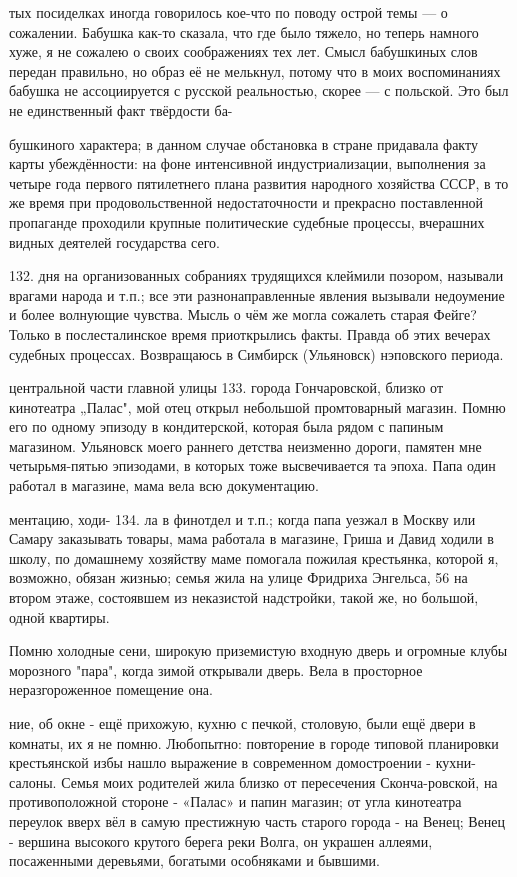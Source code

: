 тых посиделках иногда говорилось кое-что по поводу острой темы — о сожалении. Бабушка как-то сказала, что где было тяжело, но теперь намного хуже, я не сожалею о своих соображениях тех лет. Смысл бабушкиных слов передан правильно, но образ её не мелькнул, потому что в моих воспоминаниях бабушка не ассоциируется с русской реальностью, скорее — с польской. Это был не единственный факт твёрдости ба-

бушкиного характера; в данном случае обстановка в стране придавала факту карты убеждённости: на фоне интенсивной индустриализации, выполнения за четыре года первого пятилетнего плана развития народного хозяйства СССР, в то же время при продовольственной недостаточности и прекрасно поставленной пропаганде проходили крупные политические судебные процессы, вчерашних видных деятелей государства сего.

132. дня на организованных собраниях трудящихся клеймили позором, называли врагами народа и т.п.; все эти разнонаправленные явления вызывали недоумение и более волнующие чувства. Мысль о чём же могла сожалеть старая Фейге? Только в послесталинское время приоткрылись факты. Правда об этих вечерах судебных процессах. Возвращаюсь в Симбирск (Ульяновск) нэповского периода.

центральной части главной улицы 133. города Гончаровской, близко от кинотеатра „Палас", мой отец открыл небольшой промтоварный магазин. Помню его по одному эпизоду в кондитерской, которая была рядом с папиным магазином. Ульяновск моего раннего детства неизменно дороги, памятен мне четырьмя-пятью эпизодами, в которых тоже высвечивается та эпоха. Папа один работал в магазине, мама вела всю документацию.

ментацию, ходи- 134. ла в финотдел и т.п.; когда папа уезжал в Москву или Самару заказывать товары, мама работала в магазине, Гриша и Давид ходили в школу, по домашнему хозяйству маме помогала пожилая крестьянка, которой я, возможно, обязан жизнью; семья жила на улице Фридриха Энгельса, 56 на втором этаже, состоявшем из неказистой надстройки, такой же, но большой, одной квартиры.

Помню холодные сени, широкую приземистую входную дверь и огромные клубы морозного "пара", когда зимой открывали дверь. Вела в просторное неразгороженное помещение она.

ние, об окне - ещё прихожую, кухню с печкой, столовую, были ещё двери в комнаты, их я не помню. Любопытно: повторение в городе типовой планировки крестьянской избы нашло выражение в современном домостроении - кухни-салоны. Семья моих родителей жила близко от пересечения Сконча-ровской, на противоположной стороне - «Палас» и папин магазин; от угла кинотеатра переулок вверх вёл в самую престижную часть старого города - на Венец; Венец - вершина высокого крутого берега реки Волга, он украшен аллеями, посаженными деревьями, богатыми особняками и бывшими.

